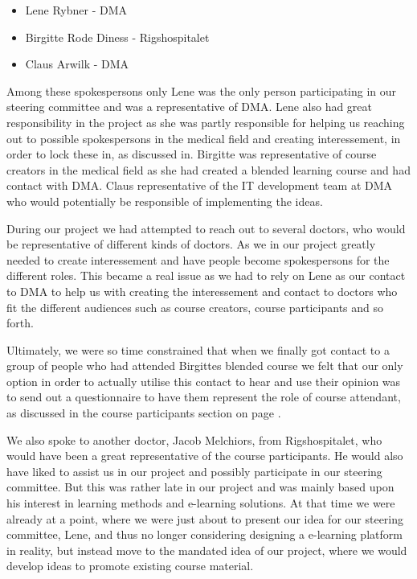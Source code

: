 \begin{itemize}
\item Lene Rybner - DMA
\item Birgitte Rode Diness - Rigshospitalet
\item Claus Arwilk - DMA
\end{itemize}


Among these spokespersons only Lene was the only person participating in our steering committee and was a representative of DMA. Lene also had great responsibility in the project as she was partly responsible for helping us reaching out to possible spokespersons in the medical field and creating interessement, in order to lock these in, as discussed in\cite{callon}. Birgitte was representative of course creators in the medical field as she had created a blended learning course and had contact with DMA. Claus representative of the IT development team at DMA who would potentially be responsible of implementing the ideas.

During our project we had attempted to reach out to several doctors, who would be representative of different kinds of doctors. As we in our project greatly needed to create interessement and have people become spokespersons for the different roles. This became a real issue as we had to rely on Lene as our contact to DMA to help us with creating the interessement and contact to doctors who fit the different audiences such as course creators, course participants and so forth.

Ultimately, we were so time constrained that when we finally got contact to a group of people who had attended Birgittes blended course we felt that our only option in order to actually utilise this contact to hear and use their opinion was to send out a questionnaire to have them represent the role of course attendant, as discussed in the course participants section on page \pageref{indepth:questionnaire}.

We also spoke to another doctor, Jacob Melchiors, from Rigshospitalet, who would have been a great representative of the course participants. He would also have liked to assist us in our project and possibly participate in our steering committee. But this was rather late in our project and was mainly based upon his interest in learning methods and e-learning solutions. At that time we were already at a point, where we were just about to present our idea for our steering committee, Lene, and thus no longer considering designing a e-learning platform in reality, but instead move to the mandated idea of our project, where we would develop ideas to promote existing course material.

